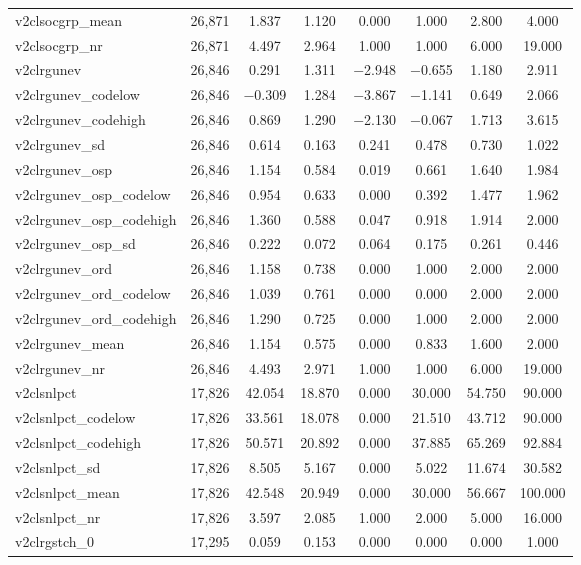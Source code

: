 \begin{table}[!htbp]
\begin{tabular}{@{\extracolsep{5pt}}lccccccc}
v2clsocgrp\_mean & 26,871 & 1.837 & 1.120 & 0.000 & 1.000 & 2.800 & 4.000 \\ 
v2clsocgrp\_nr & 26,871 & 4.497 & 2.964 & 1.000 & 1.000 & 6.000 & 19.000 \\ 
v2clrgunev & 26,846 & 0.291 & 1.311 & $-$2.948 & $-$0.655 & 1.180 & 2.911 \\ 
v2clrgunev\_codelow & 26,846 & $-$0.309 & 1.284 & $-$3.867 & $-$1.141 & 0.649 & 2.066 \\ 
v2clrgunev\_codehigh & 26,846 & 0.869 & 1.290 & $-$2.130 & $-$0.067 & 1.713 & 3.615 \\ 
v2clrgunev\_sd & 26,846 & 0.614 & 0.163 & 0.241 & 0.478 & 0.730 & 1.022 \\ 
v2clrgunev\_osp & 26,846 & 1.154 & 0.584 & 0.019 & 0.661 & 1.640 & 1.984 \\ 
v2clrgunev\_osp\_codelow & 26,846 & 0.954 & 0.633 & 0.000 & 0.392 & 1.477 & 1.962 \\ 
v2clrgunev\_osp\_codehigh & 26,846 & 1.360 & 0.588 & 0.047 & 0.918 & 1.914 & 2.000 \\ 
v2clrgunev\_osp\_sd & 26,846 & 0.222 & 0.072 & 0.064 & 0.175 & 0.261 & 0.446 \\ 
v2clrgunev\_ord & 26,846 & 1.158 & 0.738 & 0.000 & 1.000 & 2.000 & 2.000 \\ 
v2clrgunev\_ord\_codelow & 26,846 & 1.039 & 0.761 & 0.000 & 0.000 & 2.000 & 2.000 \\ 
v2clrgunev\_ord\_codehigh & 26,846 & 1.290 & 0.725 & 0.000 & 1.000 & 2.000 & 2.000 \\ 
v2clrgunev\_mean & 26,846 & 1.154 & 0.575 & 0.000 & 0.833 & 1.600 & 2.000 \\ 
v2clrgunev\_nr & 26,846 & 4.493 & 2.971 & 1.000 & 1.000 & 6.000 & 19.000 \\ 
v2clsnlpct & 17,826 & 42.054 & 18.870 & 0.000 & 30.000 & 54.750 & 90.000 \\ 
v2clsnlpct\_codelow & 17,826 & 33.561 & 18.078 & 0.000 & 21.510 & 43.712 & 90.000 \\ 
v2clsnlpct\_codehigh & 17,826 & 50.571 & 20.892 & 0.000 & 37.885 & 65.269 & 92.884 \\ 
v2clsnlpct\_sd & 17,826 & 8.505 & 5.167 & 0.000 & 5.022 & 11.674 & 30.582 \\ 
v2clsnlpct\_mean & 17,826 & 42.548 & 20.949 & 0.000 & 30.000 & 56.667 & 100.000 \\ 
v2clsnlpct\_nr & 17,826 & 3.597 & 2.085 & 1.000 & 2.000 & 5.000 & 16.000 \\ 
v2clrgstch\_0 & 17,295 & 0.059 & 0.153 & 0.000 & 0.000 & 0.000 & 1.000 \\ 

\end{tabular}
\end{table}
